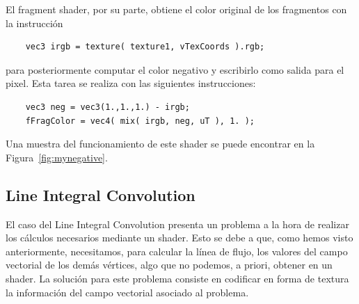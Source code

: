 El fragment shader, por su parte, obtiene el color original de los fragmentos
con la instrucción

\begin{verbatim}
    vec3 irgb = texture( texture1, vTexCoords ).rgb;
\end{verbatim}
para posteriormente computar el color negativo y escribirlo como salida para el
pixel. Esta tarea se realiza con las siguientes instrucciones:

\begin{verbatim}
    vec3 neg = vec3(1.,1.,1.) - irgb;
    fFragColor = vec4( mix( irgb, neg, uT ), 1. );
\end{verbatim}

Una muestra del funcionamiento de este shader se puede encontrar en la
Figura~\ref{fig:mynegative}.

\subsection{Line Integral Convolution}
\label{makereference5.5.8}

El caso del Line Integral Convolution presenta un problema a la hora de realizar
los cálculos necesarios mediante un shader. Esto se debe a que, como hemos visto
anteriormente, necesitamos, para calcular la línea de flujo, los valores del
campo vectorial de los demás vértices, algo que no podemos, a priori, obtener en
un shader. La solución para este problema consiste en codificar en forma de
textura la información del campo vectorial asociado al problema. 


